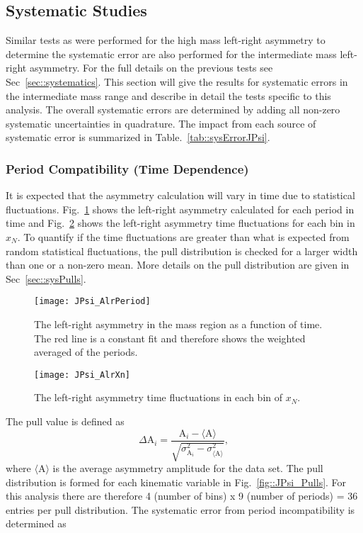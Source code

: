 \subsection{Systematic Studies}
Similar tests as were performed for the high mass left-right asymmetry to
determine the systematic error are also performed for the intermediate mass
left-right asymmetry.  For the full details on the previous tests see
Sec~\ref{sec::systematics}.  This section will give the results for systematic
errors in the intermediate mass range and describe in detail the tests specific
to this analysis.  The overall systematic errors are determined by adding all
non-zero systematic uncertainties in quadrature.  The impact from each source of
systematic error is summarized in Table.~\ref{tab::sysErrorJPsi}.

\subsubsection{Period Compatibility (Time Dependence)}
It is expected that the asymmetry calculation will vary in time due to
statistical fluctuations.  Fig.~\ref{fig::JPsi_AlrPeriod} shows the left-right
asymmetry calculated for each period in time and Fig.~\ref{fig::JPsi_AlrXn}
shows the left-right asymmetry time fluctuations for each bin in $x_N$.  To
quantify if the time fluctuations are greater than what is expected from random
statistical fluctuations, the pull distribution is checked for a larger width
than one or a non-zero mean.  More details on the pull distribution are given in
Sec~\ref{sec::sysPulls}.

\begin{figure}[h!t]
  \centering \texttt{[image: JPsi\_AlrPeriod]}
  \caption{The left-right asymmetry in the {\jp} mass region as a function of
    time.  The red line is a constant fit and therefore shows the weighted
    averaged of the periods.}
  \label{fig::JPsi_AlrPeriod}
\end{figure}

\begin{figure}[h!t]
  \centering
  \texttt{[image: JPsi\_AlrXn]}
  \caption{The left-right asymmetry time fluctuations in each bin of $x_N$.}
  \label{fig::JPsi_AlrXn}
\end{figure}

The pull value is defined as
\begin{equation}
  \label{eq::pullJPsi}
  \Delta\mathrm{A}_i =
  \frac{
    \mathrm{A}_i - \langle \mathrm{A} \rangle
  }{
    \sqrt{
      \sigma^2_{\mathrm{A}_i} - \sigma^2_{\langle \mathrm{A} \rangle}
    }
  },
\end{equation}
\noindent
where $\langle \mathrm{A} \rangle$ is the average asymmetry amplitude for the
data set.  The pull distribution is formed for each kinematic variable in
Fig.~\ref{fig::JPsi_Pulls}.  For this analysis there are therefore 4 (number of
bins) x 9 (number of periods) = 36 entries per pull distribution.  The
systematic error from period incompatibility is determined as


